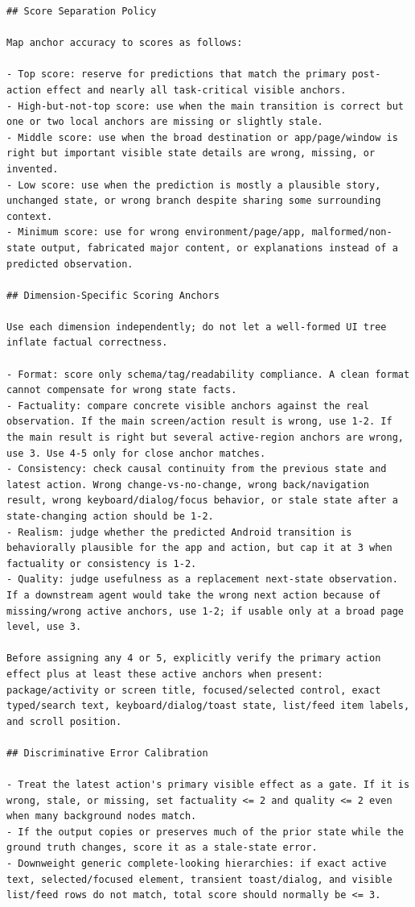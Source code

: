 \begin{lstlisting}
## Score Separation Policy

Map anchor accuracy to scores as follows:

- Top score: reserve for predictions that match the primary post-action effect and nearly all task-critical visible anchors.
- High-but-not-top score: use when the main transition is correct but one or two local anchors are missing or slightly stale.
- Middle score: use when the broad destination or app/page/window is right but important visible state details are wrong, missing, or invented.
- Low score: use when the prediction is mostly a plausible story, unchanged state, or wrong branch despite sharing some surrounding context.
- Minimum score: use for wrong environment/page/app, malformed/non-state output, fabricated major content, or explanations instead of a predicted observation.

## Dimension-Specific Scoring Anchors

Use each dimension independently; do not let a well-formed UI tree inflate factual correctness.

- Format: score only schema/tag/readability compliance. A clean format cannot compensate for wrong state facts.
- Factuality: compare concrete visible anchors against the real observation. If the main screen/action result is wrong, use 1-2. If the main result is right but several active-region anchors are wrong, use 3. Use 4-5 only for close anchor matches.
- Consistency: check causal continuity from the previous state and latest action. Wrong change-vs-no-change, wrong back/navigation result, wrong keyboard/dialog/focus behavior, or stale state after a state-changing action should be 1-2.
- Realism: judge whether the predicted Android transition is behaviorally plausible for the app and action, but cap it at 3 when factuality or consistency is 1-2.
- Quality: judge usefulness as a replacement next-state observation. If a downstream agent would take the wrong next action because of missing/wrong active anchors, use 1-2; if usable only at a broad page level, use 3.

Before assigning any 4 or 5, explicitly verify the primary action effect plus at least these active anchors when present: package/activity or screen title, focused/selected control, exact typed/search text, keyboard/dialog/toast state, list/feed item labels, and scroll position.

## Discriminative Error Calibration

- Treat the latest action's primary visible effect as a gate. If it is wrong, stale, or missing, set factuality <= 2 and quality <= 2 even when many background nodes match.
- If the output copies or preserves much of the prior state while the ground truth changes, score it as a stale-state error.
- Downweight generic complete-looking hierarchies: if exact active text, selected/focused element, transient toast/dialog, and visible list/feed rows do not match, total score should normally be <= 3.
\end{lstlisting}

